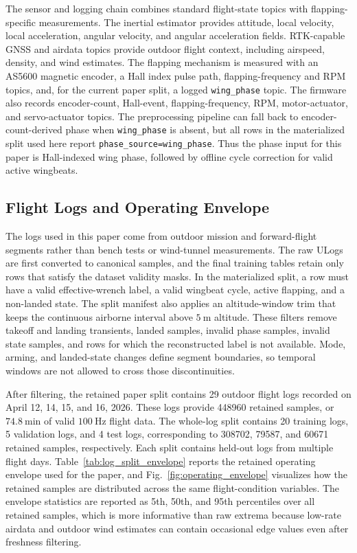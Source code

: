 The sensor and logging chain combines standard flight-state topics with flapping-specific measurements. The inertial estimator provides attitude, local velocity, local acceleration, angular velocity, and angular acceleration fields. RTK-capable GNSS and airdata topics provide outdoor flight context, including airspeed, density, and wind estimates. The flapping mechanism is measured with an AS5600 magnetic encoder, a Hall index pulse path, flapping-frequency and RPM topics, and, for the current paper split, a logged \texttt{wing\_phase} topic. The firmware also records encoder-count, Hall-event, flapping-frequency, RPM, motor-actuator, and servo-actuator topics. The preprocessing pipeline can fall back to encoder-count-derived phase when \texttt{wing\_phase} is absent, but all rows in the materialized split used here report \texttt{phase\_source=wing\_phase}. Thus the phase input for this paper is Hall-indexed wing phase, followed by offline cycle correction for valid active wingbeats.

\subsection{Flight Logs and Operating Envelope}
\label{subsec:flight_logs_envelope}

The logs used in this paper come from outdoor mission and forward-flight segments rather than bench tests or wind-tunnel measurements. The raw ULogs are first converted to canonical samples, and the final training tables retain only rows that satisfy the dataset validity masks. In the materialized split, a row must have a valid effective-wrench label, a valid wingbeat cycle, active flapping, and a non-landed state. The split manifest also applies an altitude-window trim that keeps the continuous airborne interval above $5~\mathrm{m}$ altitude. These filters remove takeoff and landing transients, landed samples, invalid phase samples, invalid state samples, and rows for which the reconstructed label is not available. Mode, arming, and landed-state changes define segment boundaries, so temporal windows are not allowed to cross those discontinuities.

After filtering, the retained paper split contains 29 outdoor flight logs recorded on April 12, 14, 15, and 16, 2026. These logs provide 448960 retained samples, or $74.8~\mathrm{min}$ of valid $100~\mathrm{Hz}$ flight data. The whole-log split contains 20 training logs, 5 validation logs, and 4 test logs, corresponding to 308702, 79587, and 60671 retained samples, respectively. Each split contains held-out logs from multiple flight days. Table~\ref{tab:log_split_envelope} reports the retained operating envelope used for the paper, and Fig.~\ref{fig:operating_envelope} visualizes how the retained samples are distributed across the same flight-condition variables. The envelope statistics are reported as 5th, 50th, and 95th percentiles over all retained samples, which is more informative than raw extrema because low-rate airdata and outdoor wind estimates can contain occasional edge values even after freshness filtering.

